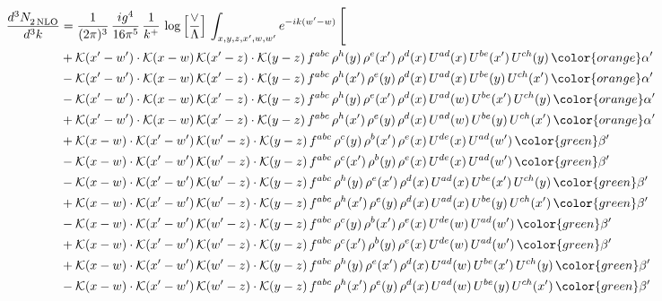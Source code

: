 \begin{align}
  \frac{d^{3}N_{2\,\rm NLO}^{\rm}}{d^{3}k}  & = \frac{1}{(2\pi)^{3}}\, \frac{ig^{4}}{16\pi^{5}}\, \frac{1}{k^{+}}\, \log{\left[\frac{\vee}{\Lambda}\right]}\, \int_{x,y,z,x^{\prime},w,w^{\prime}}e^{-ik(w^{\prime}-w)}\, \Bigg[\notag \\ &   +\mathcal{K}(x'-w')\cdot\mathcal{K}(x-w)\,\mathcal{K}(x'-z)\cdot\mathcal{K}(y-z)\, f^{abc}\,\rho^{h}(y)\,\rho^{e}(x')\,\rho^{d}(x)\,U^{ad}(x)\,U^{be}(x')\,U^{ch}(y)\,{\color{orange}\alpha'}\notag\\ &-\mathcal{K}(x'-w')\cdot\mathcal{K}(x-w)\,\mathcal{K}(x'-z)\cdot\mathcal{K}(y-z)\, f^{abc}\,\rho^{h}(x')\,\rho^{e}(y)\,\rho^{d}(x)\,U^{ad}(x)\,U^{be}(y)\,U^{ch}(x')\,{\color{orange}\alpha'}\notag\\ &-\mathcal{K}(x'-w')\cdot\mathcal{K}(x-w)\,\mathcal{K}(x'-z)\cdot\mathcal{K}(y-z)\, f^{abc}\,\rho^{h}(y)\,\rho^{e}(x')\,\rho^{d}(x)\,U^{ad}(w)\,U^{be}(x')\,U^{ch}(y)\,{\color{orange}\alpha'}\notag \\ &+\mathcal{K}(x'-w')\cdot\mathcal{K}(x-w)\,\mathcal{K}(x'-z)\cdot\mathcal{K}(y-z)\, f^{abc}\,\rho^{h}(x')\,\rho^{e}(y)\,\rho^{d}(x)\,U^{ad}(w)\,U^{be}(y)\,U^{ch}(x')\,{\color{orange}\alpha'}\notag \\ & +\mathcal{K}(x-w)\cdot\mathcal{K}(x'-w')\,\mathcal{K}(w'-z)\cdot\mathcal{K}(y-z)\, f^{abc}\,\rho^{c}(y)\,\rho^{b}(x')\,\rho^{e}(x)\,U^{de}(x)\,U^{ad}(w')\,{\color{green}\beta'}\notag \\ &-\mathcal{K}(x-w)\cdot\mathcal{K}(x'-w')\,\mathcal{K}(w'-z)\cdot\mathcal{K}(y-z)\, f^{abc}\,\rho^{c}(x')\,\rho^{b}(y)\,\rho^{e}(x)\,U^{de}(x)\,U^{ad}(w')\,{\color{green}\beta'}\notag \\ & -\mathcal{K}(x-w)\cdot\mathcal{K}(x'-w')\,\mathcal{K}(w'-z)\cdot\mathcal{K}(y-z)\, f^{abc}\,\rho^{h}(y)\,\rho^{e}(x')\,\rho^{d}(x)\,U^{ad}(x)\,U^{be}(x')\,U^{ch}(y)\,{\color{green}\beta'}\notag\\ &+\mathcal{K}(x-w)\cdot\mathcal{K}(x'-w')\,\mathcal{K}(w'-z)\cdot\mathcal{K}(y-z)\, f^{abc}\,\rho^{h}(x')\,\rho^{e}(y)\,\rho^{d}(x)\,U^{ad}(x)\,U^{be}(y)\,U^{ch}(x')\,{\color{green}\beta'}\notag\\ &-\mathcal{K}(x-w)\cdot\mathcal{K}(x'-w')\,\mathcal{K}(w'-z)\cdot\mathcal{K}(y-z)\, f^{abc}\,\rho^{c}(y)\,\rho^{b}(x')\,\rho^{e}(x)\,U^{de}(w)\,U^{ad}(w')\,{\color{green}\beta'}\notag\\ &+\mathcal{K}(x-w)\cdot\mathcal{K}(x'-w')\,\mathcal{K}(w'-z)\cdot\mathcal{K}(y-z)\, f^{abc}\,\rho^{c}(x')\,\rho^{b}(y)\,\rho^{e}(x)\,U^{de}(w)\,U^{ad}(w')\,{\color{green}\beta'}\notag\\ &+\mathcal{K}(x-w)\cdot\mathcal{K}(x'-w')\,\mathcal{K}(w'-z)\cdot\mathcal{K}(y-z)\, f^{abc}\,\rho^{h}(y)\,\rho^{e}(x')\,\rho^{d}(x)\,U^{ad}(w)\,U^{be}(x')\,U^{ch}(y)\,{\color{green}\beta'}\notag \\ &-\mathcal{K}(x-w)\cdot\mathcal{K}(x'-w')\,\mathcal{K}(w'-z)\cdot\mathcal{K}(y-z)\, f^{abc}\,\rho^{h}(x')\,\rho^{e}(y)\,\rho^{d}(x)\,U^{ad}(w)\,U^{be}(y)\,U^{ch}(x')\,{\color{green}\beta'}
\end{align}  
